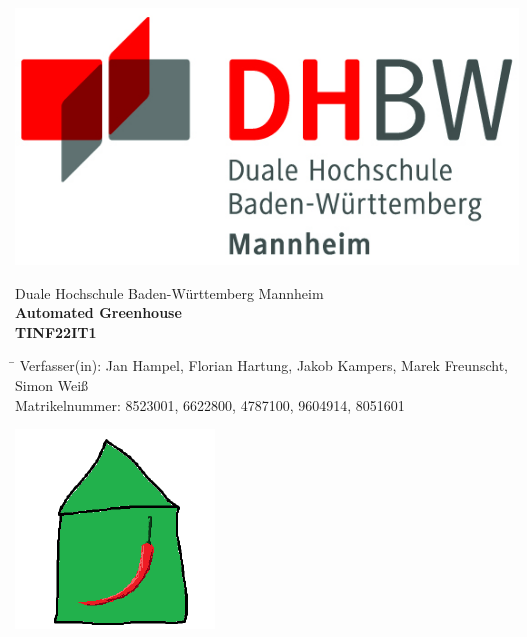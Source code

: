 \begin{titlepage}
    \begin{minipage}{\textwidth}
            \vspace{-2cm}
            \noindent \includegraphics[scale=0.5]{images/logo.jpg}
    \end{minipage}
    \vspace{1em}
    \begin{center}
        {\textsf{\large Duale Hochschule Baden-W\"urttemberg Mannheim}}\\[4em]
        {\textsf{\textbf{\large{Automated Greenhouse}}}}\\[6mm]
        {\textsf{\textbf{\large{}TINF22IT1}}}\\[4em]
        
        \begin{minipage}{\textwidth}
            \begin{tabbing}
             \hspace{0.85cm}\=\kill
            Verfasser(in):  Jan Hampel, Florian Hartung, Jakob Kampers, Marek Freunscht, Simon Weiß\\[1.5mm]
            Matrikelnummer:  8523001, 6622800, 4787100, 9604914, 8051601\\[4em]
            \end{tabbing}
            \noindent 
            \begin{center}
                \includegraphics[scale=0.5]{images/GH_logo.png}
            \end{center}
        
        \end{minipage}
    \end{center}
    \end{titlepage}